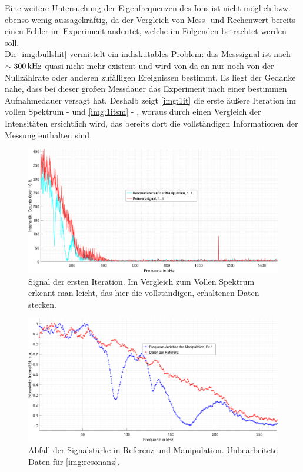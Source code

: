 \documentclass[numbers=noenddot,a4paper,notitlepage,twoside,BCOR15mm]{scrartcl}
\begin{document}
			Eine weitere Untersuchung der Eigenfrequenzen des Ions ist nicht möglich bzw. ebenso wenig aussagekräftig, da der Vergleich von Mess- und Rechenwert bereits einen Fehler im Experiment andeutet, welche im Folgenden betrachtet werden soll.\\
			Die \autoref{img:bullshit} vermittelt ein indiskutables Problem: das Messsignal ist nach $\sim\unit[300]{kHz}$ quasi nicht mehr existent und wird von da an nur noch von der Nullzählrate oder anderen zufälligen Ereignissen bestimmt. Es liegt der Gedanke nahe, dass bei dieser großen Messdauer das Experiment nach einer bestimmen Aufnahmedauer versagt hat. Deshalb zeigt \autoref{img:1it} die erste äußere Iteration im vollen Spektrum  - und \autoref{img:1itsm} - , woraus durch einen Vergleich der Intensitäten ersichtlich wird, das bereits dort die vollständigen Informationen der Messung enthalten sind.

				\begin{figure}[H]
				\includegraphics[width=\textwidth]{erste_it.png}
				\caption{Signal der ersten Iteration. Im Vergleich zum Vollen Spektrum erkennt man leicht, das hier die vollständigen, erhaltenen Daten stecken.}\label{img:1it}
				\end{figure}

				\begin{figure}[H]
					\includegraphics[width=\textwidth]{freq_smooth.png}
					\caption{Abfall der Signalstärke in Referenz und Manipulation. Unbearbeitete Daten für \autoref{img:resonanz}.}\label{img:1itsm}
				\end{figure}
\end{document}
